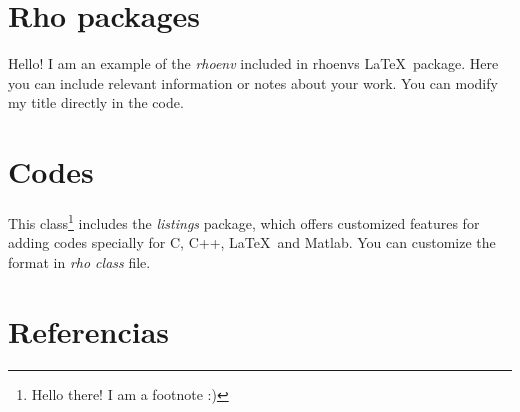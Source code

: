 \documentclass[9pt,letterpaper,onecolumn]{rho-class/rho}
\begin{document}
\section{Rho packages}

        \begin{rhoenv}[frametitle=Environment with custom title]
            Hello! I am an example of the \textit{rhoenv} included in rhoenvs \LaTeX\ package. Here you can include relevant information or notes about your work. You can modify my title directly in the code.
        \end{rhoenv}

\section{Codes}

    This class\footnote{Hello there! I am a footnote :)} includes the \textit{listings} package, which offers customized features for adding codes specially for C, C++, \LaTeX\ and Matlab. You can customize the format in \textit{rho class} file.

    

    
        

\section{Referencias}


\end{document}
